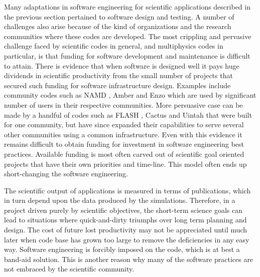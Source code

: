 
\label{sec:institutional-challenges}
Many adaptations in software engineering for scientific applications
described in the previous section pertained to software design and
testing. A number of challenges also arise because of the kind of
organizations and the research communities where these codes are
developed. The most crippling and pervasive 
challenge faced by scientific codes in general, and multiphysics codes in
particular, is that funding for software development and maintenance is difficult to attain. 
There is evidence that when software is designed well
it pays huge dividends in scientific productivity from the
small number of projects that secured such funding for software
infrastructure design. Examples include community codes such as NAMD
\cite{phillips2005scalable}, Amber \cite{case2014amber} and Enzo \cite{Enzo2013} which are used by
significant number of users in their respective communities. More
persuasive case can be made by a handful of codes such as FLASH \cite{Dubey2009, Dubey2008},
Cactus \cite{blazewiczphysics} and Uintah \cite{uintah2,TGRID10} that were built for one community,
but have since expanded their capabilities to serve several other
communities using a common infrastructure.
Even with this evidence it remains difficult to obtain
funding for investment in software engineering best practices.
Available funding is most often carved out of scientific goal 
oriented projects that have their own priorities and time-line. This
model often ends up short-changing the software engineering.


The scientific output of applications is measured in terms of publications, which in
turn depend upon the data produced by the simulations. Therefore, in a
project driven purely by scientific objectives, the short-term science
goals can lead to situations where quick-and-dirty triumphs over
long term planning and design.
The cost of future lost productivity may not be appreciated until much
later when code base has  grown too large to remove the deficiencies
in any easy way.  Software engineering is forcibly imposed on the
code, which is at best a band-aid solution. This is another reason why
many of the software practices are not embraced by the scientific community.  

